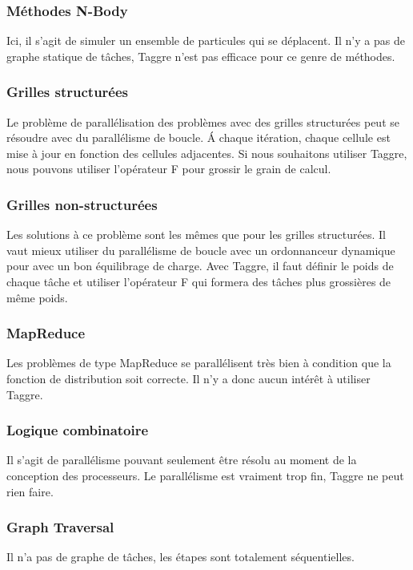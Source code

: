\subsubsection{Méthodes N-Body}
Ici, il s'agit de simuler un ensemble de particules qui se déplacent.
%
Il n'y a pas de graphe statique de tâches, Taggre n'est pas efficace pour ce genre de méthodes.



\subsubsection{Grilles structurées}
Le problème de parallélisation des problèmes avec des grilles structurées peut se résoudre avec du parallélisme de boucle.
%
\'A chaque itération, chaque cellule est mise à jour en fonction des cellules adjacentes.
%
Si nous souhaitons utiliser Taggre, nous pouvons utiliser l'opérateur F pour grossir le grain de calcul.


\subsubsection{Grilles non-structurées}
Les solutions à ce problème sont les mêmes que pour les grilles structurées.
%
Il vaut mieux utiliser du parallélisme de boucle avec un ordonnanceur dynamique pour avec un bon équilibrage de charge.
%
Avec Taggre, il faut définir le poids de chaque tâche et utiliser l'opérateur F qui formera des tâches plus grossières de même poids.


\subsubsection{MapReduce}
Les problèmes de type MapReduce se parallélisent très bien à condition que la fonction de distribution soit correcte.
%
Il n'y a donc aucun intérêt à utiliser Taggre.



\subsubsection{Logique combinatoire}
Il s'agit de parallélisme pouvant seulement être résolu au moment de la conception des processeurs.
%
Le parallélisme est vraiment trop fin, Taggre ne peut rien faire.


\subsubsection{Graph Traversal}
Il n'a pas de graphe de tâches, les étapes sont totalement séquentielles.


